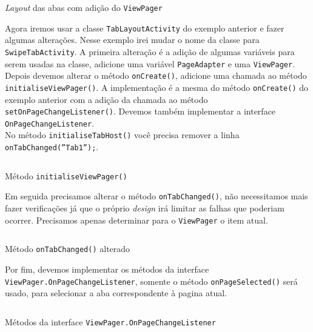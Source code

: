 \documentclass[a4paper,12pt,brazil,oneside]{book}
\begin{document}
\begin{singlespace}
	\begin{listing}[H]
	\inputminted[linenos=true,fontsize=\small,frame=lines, framesep=2mm, tabsize=2,numbersep=5pt]{xml}{src/design/swipetabs-layout.xml}
	\caption{\emph{Layout} das abas com adição do \texttt{ViewPager}}
	\label{code:layout-viewpager}
	\end{listing}
	
	Agora iremos usar a classe \texttt{TabLayoutActivity} do exemplo anterior e fazer algumas alterações.  Nesse exemplo irei mudar o nome da classe para \texttt{SwipeTabActivity}. A primeira alteração é a adição de algumas variáveis para serem usadas na classe, adicione uma variável \texttt{PageAdapter} e uma \texttt{ViewPager}. Depois devemos alterar o método \texttt{onCreate()}, adicione uma chamada ao método \texttt{initialiseViewPager()}. A implementação é a mesma do método \texttt{onCreate()} do exemplo anterior com a adição da chamada ao método \\ \texttt{setOnPageChangeListener()}. Devemos também implementar a interface \\ \texttt{OnPageChangeListener}.\\ No método \texttt{initialiseTabHost()} você precisa remover a linha \texttt{onTabChanged(''Tab1'');}.
	
	\begin{listing}[H]
	\inputminted[linenos=true,fontsize=\small,frame=lines, framesep=2mm, tabsize=2,numbersep=5pt]{java}{src/design/initialiseviewpager.java}
	\caption{Método \texttt{initialiseViewPager()}}
	\end{listing}
	
	Em seguida precisamos alterar o método \texttt{onTabChanged()}, não necessitamos mais fazer verificações já que o próprio \emph{design} irá limitar as falhas que poderiam ocorrer. Precisamos apenas determinar para o \texttt{ViewPager} o item atual. 
	
	\begin{listing}[H]
	\inputminted[linenos=true,fontsize=\small,frame=lines, framesep=2mm, tabsize=2,numbersep=5pt]{java}{src/design/ontabchanged-swipe.java}
	\caption{Método \texttt{onTabChanged()} alterado}
	\end{listing}
	
	Por fim, devemos implementar os métodos da interface \\ \texttt{ViewPager.OnPageChangeListener}, somente o método \texttt{onPageSelected()} será usado, para selecionar a aba correspondente à pagina atual.
	
	\begin{listing}[H]
	\inputminted[linenos=true,fontsize=\small,frame=lines, framesep=2mm, tabsize=2,numbersep=5pt]{java}{src/design/vpinterface.java}
	\caption{Métodos da interface \texttt{ViewPager.OnPageChangeListener}}
	\end{listing}
		

\end{singlespace}
\end{document}
